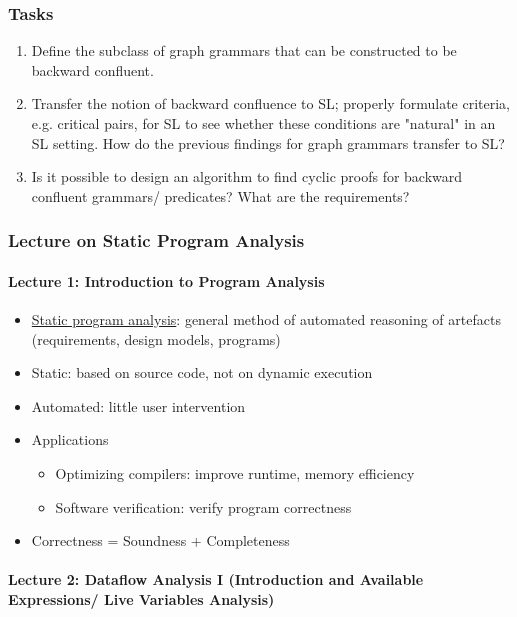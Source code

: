 \documentclass[a4paper,12pt]{article}
\begin{document}
\subsubsection{Tasks}

\begin{enumerate}
	\item Define the subclass of graph grammars that can be constructed to be backward confluent.
	\item Transfer the notion of backward confluence to SL; properly formulate criteria, e.g. critical pairs, for SL to see whether these conditions are "natural" in an SL setting. How do the previous findings for graph grammars transfer to SL?
	\item Is it possible to design an algorithm to find cyclic proofs for backward confluent grammars/ predicates? What are the requirements?
\end{enumerate}

\subsubsection{Lecture on Static Program Analysis}

\paragraph{Lecture 1: Introduction to Program Analysis}

\begin{itemize}
	\item \ul{Static program analysis}: general method of automated reasoning of artefacts (requirements, design models, programs)
	\item Static: based on source code, not on dynamic execution
	\item Automated: little user intervention
	\item Applications
	\begin{itemize}
		\item Optimizing compilers: improve runtime, memory efficiency
		\item Software verification: verify program correctness
	\end{itemize}
	\item Correctness = Soundness + Completeness
\end{itemize}

\paragraph{Lecture 2: Dataflow Analysis I (Introduction and Available Expressions/ Live Variables Analysis)}
\end{document}
